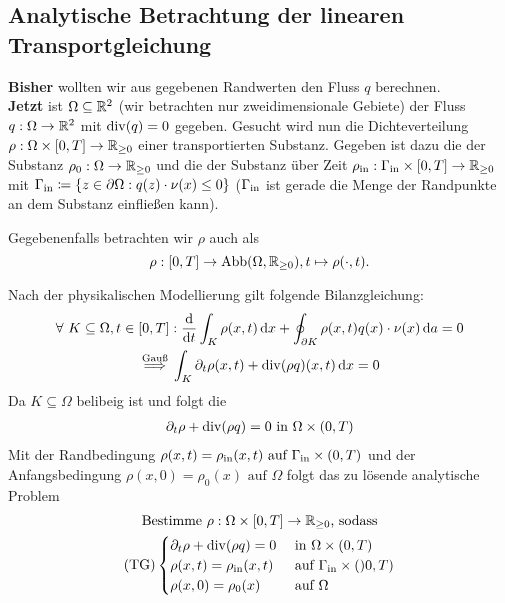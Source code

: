 \subsection{Analytische Betrachtung der linearen Transportgleichung}
\textbf{Bisher} wollten wir aus gegebenen Randwerten den Fluss $ q $ berechnen.\\
\textbf{Jetzt} ist $ \Omega \subseteq \mathbb{R}^2 $ (wir betrachten nur zweidimensionale Gebiete) der Fluss $ q: \Omega \to \mathbb{R}^2 $ mit $ \operatorname{div}(q) = 0 $ gegeben. Gesucht wird nun die Dichteverteilung $ \rho: \Omega \times [0,T] \to \mathbb{R}_{\geq 0} $ einer 
transportierten Substanz. Gegeben ist dazu die  der Substanz $ \rho_0:  \Omega \to \mathbb{R}_{\geq 0}$ und die  der Substanz über Zeit $ \rho_{\text{in}}: \Gamma_{\text{in}} \times [0,T] \to \mathbb{R}_{\geq 0} $ mit $ \Gamma_{\text{in}} \coloneqq \{ z \in \partial \Omega: q(z) \cdot \nu(x) \leq 0 \} $ ($ \Gamma_{\text{in}} $ ist gerade die Menge der Randpunkte an dem Substanz einfließen kann).

Gegebenenfalls betrachten wir $ \rho $ auch als 
\[ \rho: [0,T] \to \operatorname{Abb}(\Omega, \mathbb{R}_{\geq 0}), t \mapsto \rho(\cdot,t). \]

Nach der physikalischen Modellierung gilt folgende Bilanzgleichung:
\begin{gather*}
	\forall \ K \subseteq \Omega, t \in [0,T]: \frac{\mathop{}\!\mathrm{d}}{\mathop{}\!\mathrm{d} t} \int_K \rho(x,t) \mathop{}\!\mathrm{d} x + \oint_{\partial K} \rho(x,t) q(x) \cdot \nu(x) \mathop{}\!\mathrm{d} a = 0 \\
	\stackrel{\text{Gauß}}{\implies} \int_K \partial_t \rho(x,t) + \operatorname{div}(\rho q)(x,t) \mathop{}\!\mathrm{d} x = 0 
\end{gather*}
Da $ K \subseteq \Omega $ belibeig ist und  folgt die 
\begin{gather*}
	\partial_t \rho + \operatorname{div}(\rho q) = 0 \text{ in } \Omega \times (0,T) 
\end{gather*}
Mit der Randbedingung $ \rho(x,t) = \rho_{\text{in}}(x,t) \text{ auf } \Gamma_{\text{in}} \times (0,T)$ und der Anfangsbedingung $ \rho(x,0) = \rho_0(x) \text{ auf } \Omega $ folgt das zu lösende analytische Problem
\begin{gather*}
	\text{Bestimme } \rho: \Omega \times [0,T] \to \mathbb{R}_{\geq 0} \text{, sodass}\\
	\operatorname{(TG)}
	\begin{cases}
		\partial_t \rho + \operatorname{div}(\rho q) = 0 &\text{ in } \Omega \times (0,T)\\
		\rho(x,t) = \rho_{\text{in}}(x,t) &\text{ auf } \Gamma_{\text{in}} \times ()0,T)\\
		\rho(x,0) = \rho_0(x) &\text{ auf } \Omega
	\end{cases}
\end{gather*}




